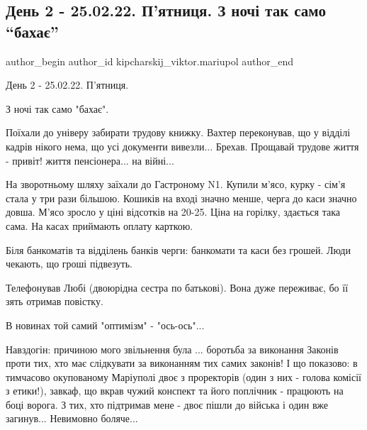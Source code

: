  
 
 
 
 

\subsection{День 2 - 25.02.22. П'ятниця.  З ночі так само \enquote{бахає}}
\label{sec:25_02_2023.fb.kipcharskij_viktor.mariupol.1.den_2_pjatnycja_z_nochi_bahaje}

\ifcmt
 author_begin
   author_id kipcharskij_viktor.mariupol
 author_end
\fi

День 2 - 25.02.22. П'ятниця. 

З ночі так само "бахає".

Поїхали до універу забирати трудову книжку. Вахтер переконував, що у відділі
кадрів нікого нема, що усі документи вивезли... Брехав. Прощавай трудове життя
- привіт! життя пенсіонера... на війні...

На зворотньому шляху заїхали до Гастроному  N1. Купили м'ясо, курку - сім'я
стала у три рази більшою. Кошиків на вході значно менше, черга до каси значно
довша. М'ясо зросло у ціні відсотків на 20-25. Ціна на горілку, здається така
сама. На касах приймають оплату карткою.

 Біля банкоматів та відділень банків черги: банкомати та каси без грошей. Люди
 чекають, що гроші підвезуть. 

Телефонував Любі (двоюрідна сестра по батькові). Вона дуже переживає, бо її
зять отримав повістку.

В новинах той самий "оптимізм" - "ось-ось"...

Навздогін: причиною мого звільнення була ... боротьба за виконання Законів
проти тих, хто має слідкувати за виконанням тих самих законів! І що показово: в
тимчасово окупованому Маріуполі двоє з проректорів (один з них - голова комісії
з етики!), завкаф, що вкрав чужий конспект та його поплічник - працюють на боці
ворога. З тих, хто підтримав мене - двоє пішли до війська і один вже загинув...
Невимовно боляче...

